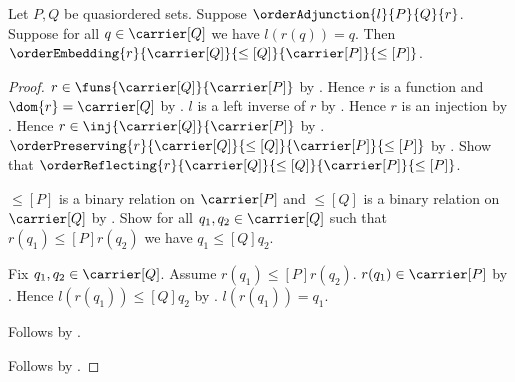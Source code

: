 \begin{proposition}\label{order_adjunction_right_embedding_of_counit_identity}
    Let $P,Q$ be quasiordered sets.
    Suppose $\orderAdjunction{l}{P}{Q}{r}$.
    Suppose for all $q\in\carrier[Q]$ we have $l(r(q))=q$.
    Then $\orderEmbedding{r}{\carrier[Q]}{\leq[Q]}
        {\carrier[P]}{\leq[P]}$.
\end{proposition}
\begin{proof}
    $r\in\funs{\carrier[Q]}{\carrier[P]}$ by
        .
    Hence $r$ is a function and $\dom{r}=\carrier[Q]$ by
        .
    $l$ is a left inverse of $r$ by
        .
    Hence $r$ is an injection by .
    Hence $r\in\inj{\carrier[Q]}{\carrier[P]}$ by
        .
    $\orderPreserving{r}{\carrier[Q]}{\leq[Q]}
        {\carrier[P]}{\leq[P]}$ by
        .
    Show that $\orderReflecting{r}{\carrier[Q]}{\leq[Q]}
        {\carrier[P]}{\leq[P]}$.
    \begin{subproof}
        $\leq[P]$ is a binary relation on $\carrier[P]$ and
            $\leq[Q]$ is a binary relation on $\carrier[Q]$ by
            .
        Show for all $q_1,q_2\in\carrier[Q]$ such that
            $r(q_1)\mathrel{\leq[P]}r(q_2)$ we have
            $q_1\mathrel{\leq[Q]}q_2$.
        \begin{subproof}
            Fix $q_1,q_2\in\carrier[Q]$.
            Assume $r(q_1)\mathrel{\leq[P]}r(q_2)$.
            $r(q_1)\in\carrier[P]$ by .
            Hence $l(r(q_1))\mathrel{\leq[Q]}q_2$ by
                .
            $l(r(q_1))=q_1$.
        \end{subproof}
        Follows by .
    \end{subproof}
    Follows by
        .
\end{proof}

